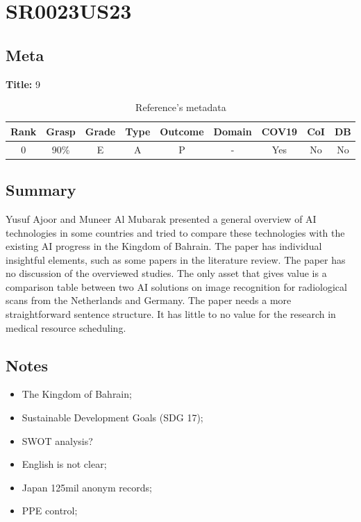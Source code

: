 \section{ SR0023US23 }


\subsection{Meta}

    \textbf{Title:}
    9

    \begin{table}[H]
        \centering
        \begin{tabular}{|c|c|c|c|c|c|c|c|c|}
            \hline
                \textbf{Rank} & \textbf{Grasp} & \textbf{Grade} & \textbf{Type} & \textbf{Outcome} & \textbf{Domain} & \textbf{COV19} & \textbf{CoI} & \textbf{DB} \\
            \hline
                0 & 90\% & E & A & P & - & Yes & No & No \\
            \hline
        \end{tabular}
        \caption{Reference's metadata}
        \label{tab:SR0023US23}
    \end{table}

\subsection{Summary}
    Yusuf Ajoor and Muneer Al Mubarak \cite{x101} presented a general overview of AI technologies in some countries and tried to compare these technologies with the existing AI progress in the Kingdom of Bahrain. The paper has individual insightful elements, such as some papers in the literature review. The paper has no discussion of the overviewed studies. The only asset that gives value is a comparison table between two AI solutions on image recognition for radiological scans from the Netherlands and Germany. The paper needs a more straightforward sentence structure. It has little to no value for the research in medical resource scheduling.

\subsection{Notes}
    \begin{itemize}
        \item The Kingdom of Bahrain;
        \item Sustainable Development Goals (SDG 17);
        \item SWOT analysis?
        \item English is not clear;
        \item Japan 125mil anonym records;
        \item PPE control;
    \end{itemize}


